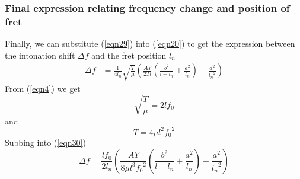 \documentclass[11pt]{article}
\begin{document}
\begin{flushleft}
            \subsubsection*{Final expression relating frequency change and position of fret}
                Finally, we can substitute (\ref{eqn29}) into (\ref{eqn20}) to get the expression between the intonation shift $\Delta f$ and the fret position $l_n$
                \begin{align}
                    \Delta f &= \frac{1}{4l_n} \sqrt{\frac{T}{\mu}} \left( \frac{AY}{2Tl} \left( \frac{b^2}{l-l_n} + \frac{a^2}{l_n} \right) - \frac{a^2}{{l_n}^2} \right) \label{eqn30}
                \end{align}
                From (\ref{eqn4}) we get
                \begin{equation*}
                    \sqrt{\frac{T}{\mu}} = 2lf_0
                \end{equation*}
                and 
                \begin{equation*}
                    T = 4\mu l^2{f_0}^2    
                \end{equation*}
                Subbing into (\ref{eqn30})
                \begin{equation}
                    \Delta f = \frac{l f_0}{2l_n} \left( \frac{AY}{8\mu l^3 {f_0}^2} \left( \frac{b^2}{l-l_n} + \frac{a^2}{l_n} \right) - \frac{a^2}{{l_n}^2} \right) \label{eqn31}
                \end{equation}
                


\end{flushleft}
\end{document}
